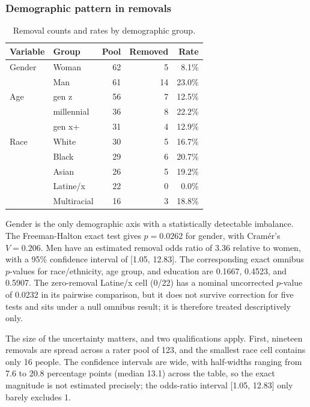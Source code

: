 \documentclass[11pt,a4paper]{article}
\begin{document}
\subsubsection{Demographic pattern in removals}
\label{sec:removal}

\begin{table}[htbp]
\centering
\caption{Removal counts and rates by demographic group.}
\label{tab:removal}
\small\begin{tabular}{llrrr}
\toprule
\textbf{Variable} & \textbf{Group} & \textbf{Pool} & \textbf{Removed} & \textbf{Rate} \\
\midrule
Gender & Woman & 62 & 5 & 8.1\% \\
       & Man & 61 & 14 & 23.0\% \\
\midrule
Age & gen z & 56 & 7 & 12.5\% \\
    & millennial & 36 & 8 & 22.2\% \\
    & gen x+ & 31 & 4 & 12.9\% \\
\midrule
Race & White & 30 & 5 & 16.7\% \\
     & Black & 29 & 6 & 20.7\% \\
     & Asian & 26 & 5 & 19.2\% \\
     & Latine/x & 22 & 0 & 0.0\% \\
     & Multiracial & 16 & 3 & 18.8\% \\
\bottomrule
\end{tabular}
\end{table}

Gender is the only demographic axis with a statistically detectable imbalance. The Freeman-Halton exact test gives $p = 0.0262$ for gender, with Cram\'{e}r's
$V = 0.206$. Men have an estimated removal odds ratio of 3.36 relative to women, with a 95\%
confidence interval of [1.05, 12.83]. The corresponding exact omnibus $p$-values for
race/ethnicity, age group, and education are 0.1667, 0.4523, and 0.5907. The zero-removal
Latine/x cell (0/22) has a nominal uncorrected $p$-value of 0.0232 in its pairwise comparison,
but it does not survive correction for five tests and sits under a null omnibus result; it is
therefore treated descriptively only.

The size of the uncertainty matters, and two qualifications apply. First, nineteen removals are
spread across a rater pool of 123, and the smallest race cell contains only 16 people. The
confidence intervals are wide, with half-widths ranging from 7.6 to 20.8 percentage points
(median 13.1) across the
table, so the exact magnitude is not estimated precisely; the odds-ratio interval [1.05, 12.83]
only barely excludes 1.
\end{document}
